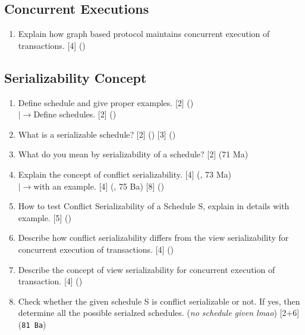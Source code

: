 \documentclass[12pt]{article}
\newcommand{\lb}{\\$\left|\rightarrow\right.$}
\begin{document}
    \subsection{Concurrent Executions}
        \begin{enumerate}
            \item Explain how graph based protocol maintains concurrent execution of transactions. \hfill [4] ()
        \end{enumerate}

    \subsection{Serializability Concept}
        \begin{enumerate}[noitemsep, topsep=0pt]
            \item Define schedule and give proper examples. \hfill [2] ()
            \lb Define schedules. \hfill [2] ()

            \item What is a serializable schedule? \hfill [2] () [3] ()

            \item What do you mean by serializability of a schedule? \hfill [2] (71 Ma)
            
            \item Explain the concept of conflict serializability. \hfill [4] (, 73 Ma)
            \lb with an example. \hfill [4] (, 75 Ba) [8] ()

            \item How to test Conflict Serializability of a Schedule S, explain in details with example. \hfill [5] ()

            \item Describe how conflict serializability differs from the view serializability for concurrent execution of transactions. \hfill [4] ()

            \item Describe the concept of view serializability for concurrent execution of transaction. \hfill [4] ()
            
            \item Check whether the given schedule S is conflict serializable or not. If yes, then determine all the possible serialzed schedules. (\textit{no schedule given lmao}) \hfill [2+6] (\texttt{81 Ba})            


\end{enumerate}
\end{document}

